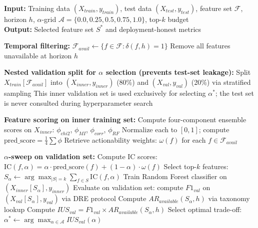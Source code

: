 \documentclass[a4paper,fleqn]{cas-sc}
\begin{document}
\begin{algorithm}
\caption{IC-FS(full) with Nested Validation for $\alpha$ Selection}
\label{alg:icfs}
\textbf{Input:} Training data $(X_{train}, y_{train})$, test data $(X_{test}, y_{test})$, feature set $\mathcal{F}$, horizon $h$, $\alpha$-grid $\mathcal{A} = \{0.0, 0.25, 0.5, 0.75, 1.0\}$, top-$k$ budget \\
\textbf{Output:} Selected feature set $S^*$ and deployment-honest metrics
\begin{algorithmic}[1]
    \State \textbf{Temporal filtering:} $\mathcal{F}_{avail} \leftarrow \{f \in \mathcal{F} : \delta(f, h) = 1\}$
    \Statex \hspace{\algorithmicindent} Remove all features unavailable at horizon $h$

    \State \textbf{Nested validation split for $\alpha$ selection (prevents test-set leakage):}
    \Statex \hspace{\algorithmicindent} Split $X_{train}[\mathcal{F}_{avail}]$ into $(X_{inner}, y_{inner})$ (80\%) and $(X_{val}, y_{val})$ (20\%) via stratified sampling
    \Statex \hspace{\algorithmicindent} This inner validation set is used exclusively for selecting $\alpha^*$; the test set is never consulted during hyperparameter search

    \State \textbf{Feature scoring on inner training set:}
    \Statex \hspace{\algorithmicindent} Compute four-component ensemble scores on $X_{inner}$: $\phi_{chi2}$, $\phi_{MI}$, $\phi_{corr}$, $\phi_{RF}$
    \Statex \hspace{\algorithmicindent} Normalize each to $[0,1]$; compute $\text{pred\_score} = \frac{1}{4}\sum \phi$
    \Statex \hspace{\algorithmicindent} Retrieve actionability weights: $\omega(f)$ for each $f \in \mathcal{F}_{avail}$

    \State \textbf{$\alpha$-sweep on validation set:}
        \State Compute IC scores: $\text{IC}(f, \alpha) = \alpha \cdot \text{pred\_score}(f) + (1-\alpha) \cdot \omega(f)$
        \State Select top-$k$ features: $S_\alpha \leftarrow \arg\max_{|S|=k} \sum_{f \in S} \text{IC}(f, \alpha)$
        \State Train Random Forest classifier on $(X_{inner}[S_\alpha], y_{inner})$
        \State Evaluate on validation set: compute $F1_{val}$ on $(X_{val}[S_\alpha], y_{val})$ via DRE protocol
        \State Compute $AR_{available}(S_\alpha, h)$ via taxonomy lookup
        \State Compute $IUS_{val} = F1_{val} \times AR_{available}(S_\alpha, h)$
    \EndFor
    \State Select optimal trade-off: $\alpha^* \leftarrow \arg\max_{\alpha \in \mathcal{A}} IUS_{val}(\alpha)$


\end{algorithmic}
\end{algorithm}
\end{document}
